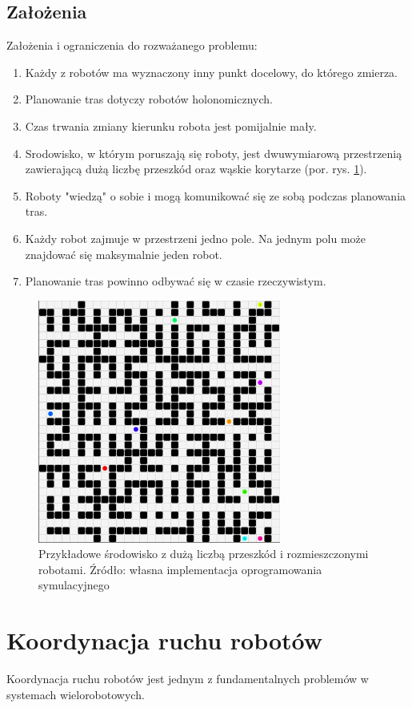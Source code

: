\subsection{Założenia}
Założenia i ograniczenia do rozważanego problemu:
\begin{enumerate}
	\item Każdy z robotów ma wyznaczony inny punkt docelowy, do którego zmierza.
	\item Planowanie tras dotyczy robotów holonomicznych.
	\item Czas trwania zmiany kierunku robota jest pomijalnie mały.
	\item Srodowisko, w którym poruszają się roboty, jest dwuwymiarową przestrzenią zawierającą dużą liczbę przeszkód oraz wąskie korytarze (por. rys. \ref{fig:img_robopath_sample-maze}).
	\item Roboty "wiedzą" o sobie i mogą komunikować się ze sobą podczas planowania tras.
	\item Każdy robot zajmuje w przestrzeni jedno pole. Na jednym polu może znajdować się maksymalnie jeden robot.
	\item Planowanie tras powinno odbywać się w czasie rzeczywistym.
\end{enumerate}

\begin{figure}[H]
	\centering
	\includegraphics[width=8cm]{img/robopath/sample-maze}
	\caption{Przykładowe środowisko z dużą liczbą przeszkód i rozmieszczonymi robotami. Źródło: własna implementacja oprogramowania symulacyjnego}
	\label{fig:img_robopath_sample-maze}
\end{figure}


\clearpage
\section{Koordynacja ruchu robotów}
Koordynacja ruchu robotów jest jednym z fundamentalnych problemów w systemach wielorobotowych. \cite{optpriorities}

